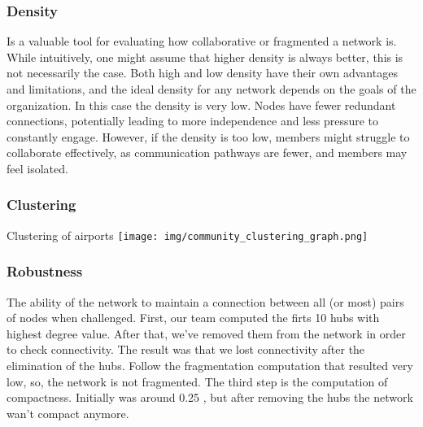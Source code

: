\documentclass[12pt]{article}
\begin{document}
\begin{minipage}{\textwidth}
    \subsubsection{Density}
    { Is a valuable tool for evaluating how collaborative or fragmented a network is. While intuitively, one might assume that higher density is always better, this is not necessarily the case. Both high and low density have their own advantages and limitations, and the ideal density for any network depends on the goals of the organization. In this case the density is very low. Nodes have fewer redundant connections, potentially leading to more independence and less pressure to constantly engage. However, if the density is too low, members might struggle to collaborate effectively, as communication pathways are fewer, and members may feel isolated.
    }
    \centering
\end{minipage}
\newpage
\begin{minipage}{\textwidth}
    \subsubsection{Clustering}
    {Clustering of airports}
    \centering
    \texttt{[image: img/community\_clustering\_graph.png]}
\end{minipage}

\begin{minipage}{\textwidth}
    \subsubsection{Robustness}
    {The ability of the network to maintain a connection between all (or most) pairs of nodes when challenged. First, our team computed the firts 10 hubs with highest degree value. After that, we've removed them from the network in order to check connectivity. The result was that we lost connectivity after the elimination of the hubs. Follow the fragmentation computation that resulted very low, so, the network is not fragmented. The third step is the computation of compactness. Initially was around 0.25 , but after removing the hubs the network wan't compact anymore.}
\end{minipage}
\end{document}
